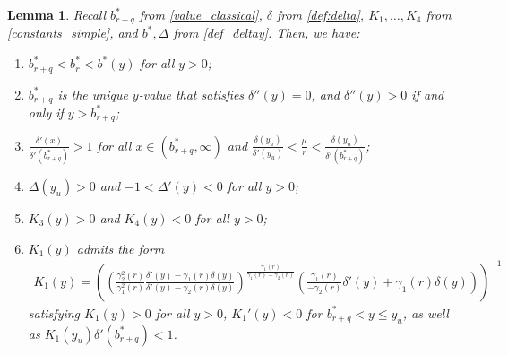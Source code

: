 \documentclass[11pt]{article} %
\newtheorem{lemma}[theorem]{Lemma}
\numberwithin{komcounter}{section}
\numberwithin{equation}{section}
\numberwithin{theorem}{section}
\begin{document}
\begin{lemma}\label{lemma:yl}
Recall $b^*_{r+q}$ from \eqref{value_classical}, $\delta$ from \eqref{def:delta}, $K_1, \ldots, K_4$ from \eqref{constants_simple}, and $b^*, \Delta$ from \eqref{def_deltay}. 
Then, we have:
\begin{enumerate}[\rm (i)]
\item 
$b^*_{r+q} < b^*_{r} < b^*(y)$ for all $y > 0$;
\item 
$b^*_{r+q}$ is the unique $y$-value that satisfies $\delta''(y)=0$, 
and 
$\delta''(y) > 0$ if and only if $y > b^*_{r+q}$;
\item 
$\frac{\delta'(x)}{\delta'(b^*_{r+q})}>1$ for all $x\in (b^*_{r+q},\infty)$ 
and 
$\frac{\delta(y_u)}{\delta'(y_u)}< \frac{\mu}{r} < \frac{\delta(y_u)}{\delta'(b^*_{r+q})}$;
\item $\Delta(y_u)>0$ and $-1 < \Delta'(y) < 0$ for all $y > 0$;
\item $K_3(y) > 0$ and $K_4(y) < 0$ for all $y > 0$;
\item $K_1(y)$ admits the form
\begin{align}\label{k1_form} 
K_1(y)= \left( \left(\frac{\gamma_2^2(r)}{\gamma_1^2(r)}\frac{\delta'(y) - \gamma_1(r)\delta(y)}{\delta'(y) - \gamma_2(r)\delta(y)}  \right)^{\frac{\gamma_1(r)}{\gamma_1(r) - \gamma_2(r)}}
\left(\frac{\gamma_1(r)}{-\gamma_2(r)}\delta'(y) + \gamma_1(r)\delta(y) \right)\right)^{-1}
\end{align}
satisfying $K_1(y) >0$ for all $y > 0$, $K_1'(y) < 0$ for $b^*_{r+q} < y \leq y_u$, as well as $K_1(y_u)\delta'(b^*_{r+q})<1$.
\end{enumerate}
\end{lemma}
\end{document}
